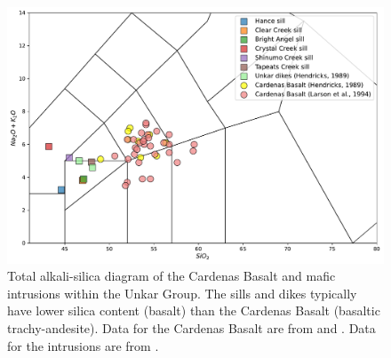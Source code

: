 \documentclass[11pt,letterpaper]{article}
\begin{document}
\begin{figure}[h!]
\centering
\includegraphics[width=\textwidth]{Cardenas_Unkar_geochem_major.pdf}
\caption[Major element geochemical data of the Cardenas Basalt and diabase intrusions in the Unkar Group.]{Total alkali-silica diagram of the Cardenas Basalt and mafic intrusions within the Unkar Group. The sills and dikes typically have lower silica content (basalt) than the Cardenas Basalt (basaltic trachy-andesite). Data for the Cardenas Basalt are from \cite{Hendricks1989a} and \cite{Larson1994a}. Data for the intrusions are from \cite{Hendricks1989a}.}
\label{fig:geochem_major}
\end{figure}
\end{document}
